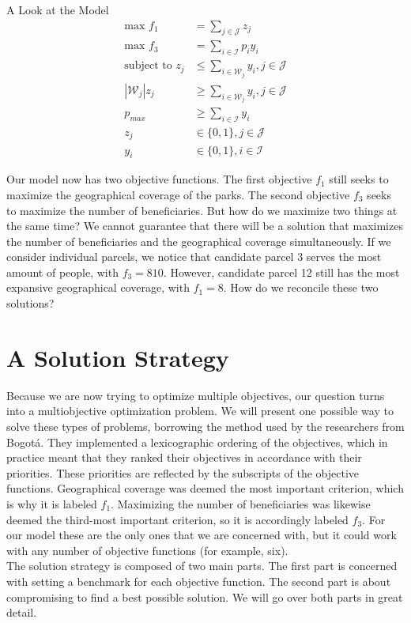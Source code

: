 \documentclass[12pt]{pom_thesis}
\theoremstyle{definition}
\begin{document}
\begin{chapter}{A Look at the Model}
\begin{align*}
\textrm{max } f_1 &= \sum_{j \in \mathcal{J}} z_j \\
\textrm{max } f_3 &= \sum_{i \in \mathcal{I}} p_iy_i \\
\textrm{subject to } z_j &\leq \sum_{i \in \mathcal{W}_j} y_i, j \in \mathcal{J}\\
\left|\mathcal{W}_j\right|z_j &\geq \sum_{i \in \mathcal{W}_j} y_i, j \in \mathcal{J} \\
p_{max} &\geq \sum_{i \in \mathcal{I}}y_i \\
z_j &\in \{0,1\}, j \in \mathcal{J} \\
y_i &\in \{0,1\}, i \in \mathcal{I}
\end{align*}

	Our model now has two objective functions. The first objective $f_1$ still seeks to maximize the geographical coverage of the parks. The second objective $f_3$ seeks to maximize the number of beneficiaries. But how do we maximize two things at the same time? We cannot guarantee that there will be a solution that maximizes the number of beneficiaries and the geographical coverage simultaneously. If we consider individual parcels, we notice that candidate parcel 3 serves the most amount of people, with $f_3 = 810$. However, candidate parcel 12 still has the most expansive geographical coverage, with $f_1 = 8$. How do we reconcile these two solutions?
%
%
%
%
\section{A Solution Strategy} \label{solution-strat}

	Because we are now trying to optimize multiple objectives, our question turns into a multiobjective optimization problem. We will present one possible way to solve these types of problems, borrowing the method used by the researchers from Bogot\'{a}. They implemented a lexicographic ordering of the objectives, which in practice meant that they ranked their objectives in accordance with their priorities. These priorities are reflected by the subscripts of the objective functions. Geographical coverage was deemed the most important criterion, which is why it is labeled $f_1$. Maximizing the number of beneficiaries was likewise deemed the third-most important criterion, so it is accordingly labeled $f_3$. For our model these are the only ones that we are concerned with, but it could work with any number of objective functions (for example, six). \\
	The solution strategy is composed of two main parts. The first part is concerned with setting a benchmark for each objective function. The second part is about compromising to find a best possible solution. We will go over both parts in great detail.
%
%	

\end{chapter}
\end{document}
